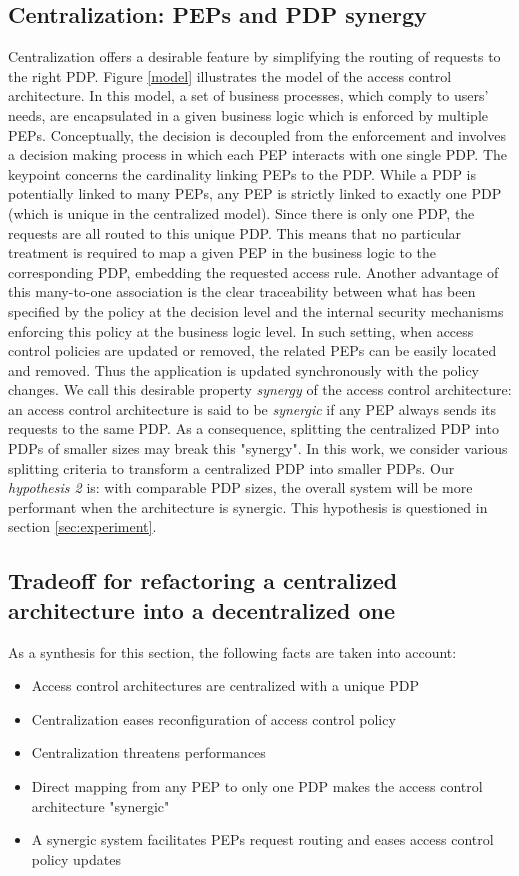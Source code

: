 \subsection{Centralization: PEPs and PDP synergy}
Centralization offers a desirable feature by simplifying the routing of requests to the right PDP. 
Figure \ref{model} illustrates the model of the access control architecture. In this model, a set of business processes, which comply to users' needs, are encapsulated in a given business logic 
which is enforced by multiple PEPs. Conceptually, the decision is decoupled from the enforcement and involves a decision making process in which each PEP 
interacts with one single PDP. The keypoint concerns the cardinality linking PEPs to the PDP. While a PDP is potentially linked to many PEPs, any PEP is strictly linked to exactly one 
PDP (which is unique in the centralized model). 
Since there is only one PDP, the requests are all routed to this unique PDP. This means that no particular treatment is required to map a given PEP in the business logic to 
the corresponding PDP, embedding the requested access rule. Another advantage of this many-to-one association is the clear traceability between what has been specified by the 
policy at the decision level and the internal security mechanisms enforcing this policy at the business logic level. In such setting, 
when access control policies are updated or removed, the related PEPs can be easily located and removed. Thus the application is updated synchronously 
with the policy changes. We call this desirable property \textit{synergy} of the access control architecture: an access control architecture is said to be \textit{synergic} if any PEP always sends 
its requests  to the same PDP. 
As a consequence, splitting the centralized PDP into PDPs of smaller sizes may break this "synergy". In this work, we consider various splitting criteria to transform a centralized PDP into smaller PDPs. 
Our \textit{hypothesis 2} is: with comparable PDP sizes, the overall system will be more performant when the architecture is synergic. This hypothesis is questioned in 
section \ref{sec:experiment}.

\subsection{Tradeoff for refactoring a centralized architecture into a decentralized one}

As a synthesis for this section, the following facts are taken into account:
\begin{itemize}
 \item Access control architectures are centralized with a unique PDP
\item Centralization eases reconfiguration of access control policy
\item Centralization threatens performances
\item Direct mapping from any PEP to only one PDP makes the access control architecture "synergic"
\item A synergic system facilitates PEPs request routing and eases access control policy updates

\end{itemize}

